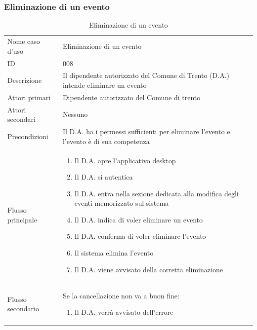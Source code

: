 \documentclass{article}
\begin{document}
\clearpage

\subsubsection{Eliminazione di un evento}

\begin{table}[htbp]
    \label{8.3.4}
    \centering
    \begin{tabularx}{\textwidth}{| l | p{} |}
        \Xhline{2pt} %
        Nome caso d'uso & Eliminazione di un evento \\
        \Xhline{2pt} %
        ID & 008 \\
        \hline
        Descrizione & Il dipendente autorizzato del Comune di Trento (D.A.) intende eliminare un evento\\
        \hline
        Attori primari & Dipendente autorizzato del Comune di trento\\
        \hline
        Attori secondari & Nessuno \\
        \hline
        Precondizioni & Il D.A. ha i permessi sufficienti per eliminare l'evento e l'evento è di sua competenza \\
        \hline
        Flusso principale & 
        \begin{enumerate}[topsep=5pt,partopsep=0pt,parsep=0pt,itemsep=0pt,before=\vspace{-\baselineskip},after=\vspace{-\baselineskip}]                
            \item Il D.A. apre l'applicativo desktop
            \item Il D.A. si autentica
            \item Il D.A. entra nella sezione dedicata alla modifica degli eventi memorizzato sul sistema
            \item Il D.A. indica di voler eliminare un evento
            \item Il D.A. conferma di voler eliminare l'evento
            \item Il sistema elimina l'evento
            \item Il D.A. viene avvisato della corretta eliminazione
        \end{enumerate}
        \\
        \hline
        Flusso secondario & 
        Se la cancellazione non va a buon fine:
        \begin{enumerate}[topsep=10pt,partopsep=0pt,parsep=0pt,itemsep=0pt,before=\vspace{-\baselineskip},after=\vspace{-\baselineskip}]
            \item Il D.A. verrà avvisato dell'errore
        \end{enumerate}
        \\
        \hline
    \end{tabularx}
    \caption{Eliminazione di un evento}
    \label{tab:tabella_use_case008}
\end{table}
\end{document}
